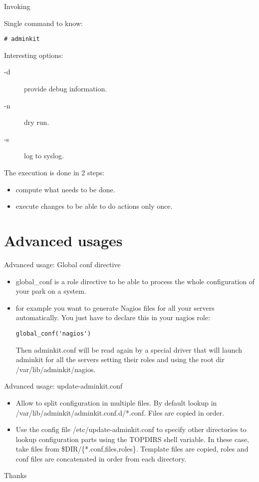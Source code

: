 \documentclass[xcolor=dvipsnames]{beamer}
\begin{document}
\begin{frame}[fragile]{Invoking}

Single command to know:

\begin{lstlisting}
# adminkit
\end{lstlisting}

Interesting options:

\begin{description}
  \item[-d] provide debug information.
  \item[-n] dry run.
  \item[-s] log to syslog.
\end{description}

The execution is done in 2 steps:
\begin{itemize}
  \item compute what needs to be done.
  \item execute changes to be able to do actions only once.
\end{itemize}
\end{frame}

\section{Advanced usages}

\begin{frame}[fragile]{Advanced usage: Global conf directive}

\begin{itemize}
  \item global\_conf is a role directive to be able to process the whole
  configuration of your park on a system.
  \item for example you want to generate Nagios files for all your servers automatically. You just have to declare this in your nagios role:
\begin{lstlisting}
global_conf('nagios')
\end{lstlisting}
        Then adminkit.conf will be read again by a special driver that
        will launch adminkit for all the servers setting their roles
        and using the root dir /var/lib/adminkit/nagios.
\end{itemize}
\end{frame}

\begin{frame}{Advanced usage: update-adminkit.conf}
\begin{itemize}
  \item Allow to split configuration in multiple files. By default
    lookup in /var/lib/adminkit/adminkit.conf.d/*.conf. Files are
    copied in order.
  \item Use the config file /etc/update-adminkit.conf to specify other
    directories to lookup configuration parts using the TOPDIRS shell
    variable. In these case, take files from
    \$DIR/\{*.conf,files,roles\}. Template files are copied, roles and
    conf files are concatenated in order from each directory.
\end{itemize}
\end{frame}

\begin{frame}{Thanks}
  \begin{center}
  \end{center}
\end{frame}
\end{document}
